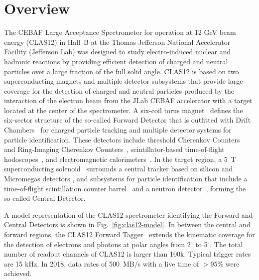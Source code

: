 \section{Overview}
\label{overview}

The CEBAF Large Acceptance Spectrometer for operation at 12 GeV beam energy (CLAS12) \cite{clas12-nim} in
Hall~B at the Thomas Jefferson National Accelerator Facility (Jefferson Lab) was designed to study
electro-induced nuclear and hadronic reactions by providing efficient detection of charged and neutral particles
over a large fraction of the full solid angle.
CLAS12 is based on two superconducting magnets and multiple detector subsystems that provide large
coverage for the detection of charged and neutral particles produced by the interaction of the electron beam
from the JLab CEBAF accelerator with a target located at the center of the spectrometer. A six-coil torus
magnet~\cite{magnets-nim} defines the six-sector structure of the so-called Forward Detector that is outfitted
with Drift Chambers~\cite{dc-nim} for charged particle tracking and multiple detector systems for particle
identification. These detectors include threshold Cherenkov Counters~\cite{ltcc-nim, htcc-nim} and Ring-Imaging
Cherenkov Counters~\cite{rich-nim}, scintillator-based time-of-flight hodoscopes~\cite{ftof-nim}, and electromagnetic
calorimeters~\cite{ec-nim}. In the target region, a 5~T superconducting solenoid~\cite{magnets-nim} surrounds a
central tracker based on silicon and Micromegas detectors \cite{svt-nim,mm-nim}, and subsystems for particle
identification that include a time-of-flight scintillation counter barrel~\cite{ctof-nim} and a neutron
detector~\cite{cnd-nim}, forming the so-called Central Detector.

A model representation of the CLAS12 spectrometer identifying the Forward and Central Detectors is shown in
Fig.~\ref{fig:clas12-model}. In between the central and forward regions, the CLAS12 Forward Tagger~\cite{ft-nim}
extends the kinematic coverage for the detection of electrons and photons at polar angles from 2$^\circ$ to 5$^\circ$.
The total number of readout channels of CLAS12 is larger than 100k. Typical trigger rates are 15 kHz. In 2018, data
rates of 500~MB/s with a live time of $>$95\% were achieved.

